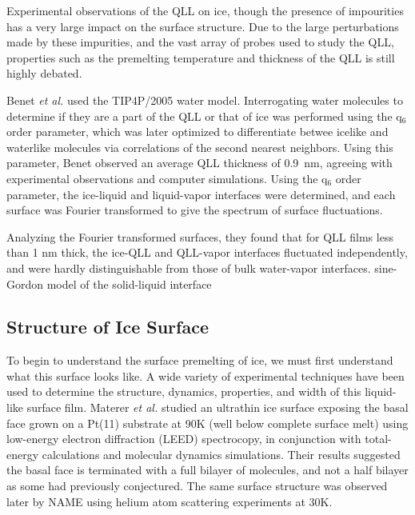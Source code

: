 Experimental observations of the QLL on ice\cite{8-14}, though the
presence of impourities has a very large impact on the surface
structure.\cite{12,15} Due to the large perturbations made by these
impurities, and the vast array of probes used to study the QLL,
properties such as the premelting temperature and thickness of the QLL
is still highly debated.\cite{8} 

Benet \textit{et al.} used the TIP4P/2005 water model. Interrogating
water molecules to determine if they are a part of the QLL or that of
ice was performed using the q$_{6}$ order parameter\cite{42}, which
was later optimized to differentiate betwee icelike and waterlike
molecules via correlations of the second nearest neighbors.\cite{43}
Using this parameter, Benet observed an average QLL thickness of
0.9~nm, agreeing with experimental observations\cite{12,14} and
computer simulations.\cite{38-40} Using the q$_{6}$ order parameter,
the ice-liquid and liquid-vapor interfaces were determined, and each
surface was Fourier transformed to give the spectrum of surface
fluctuations.

Analyzing the Fourier transformed surfaces, they found that for QLL
films less than 1 nm thick, the ice-QLL and QLL-vapor interfaces
fluctuated independently, and were hardly distinguishable from those
of bulk water-vapor interfaces. sine-Gordon model of the solid-liquid
interface\cite{20,45}


\subsection{Structure of Ice Surface}
To begin to understand the surface premelting of ice, we must first
understand what this surface looks like. A wide variety of
experimental techniques have been used to determine the structure,
dynamics, properties, and width of this liquid-like surface film.
Materer \textit{et al.} studied an ultrathin ice surface exposing the
basal face grown on a Pt(11) substrate at 90K (well below complete
surface melt) using low-energy electron diffraction (LEED)
spectrocopy, in conjunction with total-energy calculations and
molecular dynamics simulations.\cite{Materer95,Materer97} Their results suggested
the basal face is terminated with a full bilayer of molecules, and not
a half bilayer as some had previously conjectured. The same surface
structure was observed later by NAME using helium atom scattering
experiments at 30K.\cite{Braun98,Glebov00}

